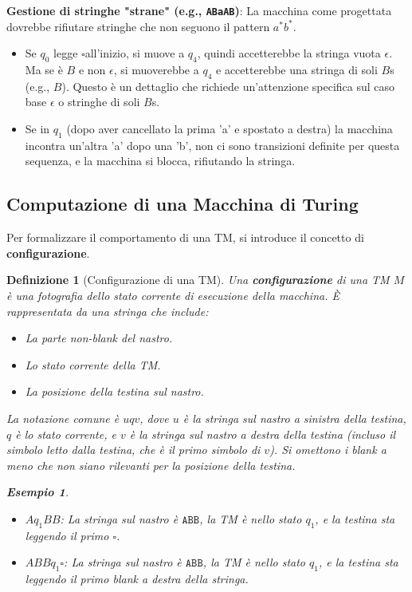 \documentclass[a4paper]{article}
\newtheorem{definition}{Definizione}
\newtheorem{example}{Esempio}
\newcommand{\blankS}{\ensuremath{\square}}
\begin{document}
\textbf{Gestione di stringhe "strane" (e.g., \texttt{ABaAB})}:
La macchina come progettata dovrebbe rifiutare stringhe che non seguono il pattern $a^*b^*$.
\begin{itemize}
    \item Se $q_0$ legge \blankS all'inizio, si muove a $q_4$, quindi accetterebbe la stringa vuota $\epsilon$. Ma se è $B$ e non $\epsilon$, si muoverebbe a $q_4$ e accetterebbe una stringa di soli $B$s (e.g., $B$). Questo è un dettaglio che richiede un'attenzione specifica sul caso base $\epsilon$ o stringhe di soli $B$s.
    \item Se in $q_1$ (dopo aver cancellato la prima 'a' e spostato a destra) la macchina incontra un'altra 'a' dopo una 'b', non ci sono transizioni definite per questa sequenza, e la macchina si blocca, rifiutando la stringa.
\end{itemize}

\subsection{Computazione di una Macchina di Turing}
Per formalizzare il comportamento di una TM, si introduce il concetto di \textbf{configurazione}.

\begin{definition}[Configurazione di una TM]
    Una \textbf{configurazione} di una TM $M$ è una fotografia dello stato corrente di esecuzione della macchina. È rappresentata da una stringa che include:
    \begin{itemize}
        \item La parte non-blank del nastro.
        \item Lo stato corrente della TM.
        \item La posizione della testina sul nastro.
    \end{itemize}
    La notazione comune è $uqv$, dove $u$ è la stringa sul nastro a sinistra della testina, $q$ è lo stato corrente, e $v$ è la stringa sul nastro a destra della testina (incluso il simbolo letto dalla testina, che è il primo simbolo di $v$). Si omettono i blank a meno che non siano rilevanti per la posizione della testina.
    \begin{example}
        \begin{itemize}
            \item $A q_1 BB$: La stringa sul nastro è $\texttt{ABB}$, la TM è nello stato $q_1$, e la testina sta leggendo il primo $\blankS$.
            \item $ABB q_1 \blankS$: La stringa sul nastro è $\texttt{ABB}$, la TM è nello stato $q_1$, e la testina sta leggendo il primo blank a destra della stringa.
        \end{itemize}
    \end{example}
\end{definition}
\end{document}
